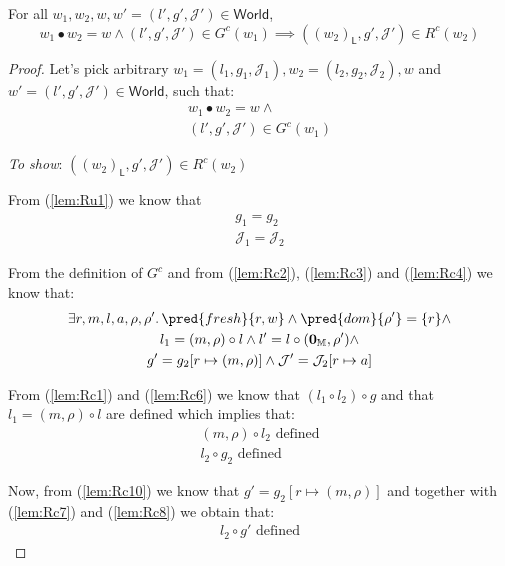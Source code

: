 \lem \label{lem:Rc}  For all $w_1, w_2, w, w' = (l', g', \mathcal{J}') \in \mathsf{World}$,
\[
	w_1 \bullet w_2 = w \land (l', g', \mathcal{J}') \in G^c(w_1) \implies ((w_2)_\mathsf{L}, g', \mathcal{J}') \in R^c(w_2)
\]

{\parindent0pt
\begin{proof}
Let's pick arbitrary $w_1 = (l_1, g_1, \mathcal{J}_1), w_2 = (l_2, g_2, \mathcal{J}_2), w$ and $w' = (l', g', \mathcal{J}') \in \mathsf{World}$, such that:
\begin{gather}
	\label{lem:Rc1} w_1 \bullet w_2 = w \land \\
	\label{lem:Rc2} (l', g', \mathcal{J}') \in G^c(w_1)
\end{gather}

\textit{To show}: $((w_2)_\mathsf{L}, g', \mathcal{J}') \in R^c(w_2)$

From (\ref{lem:Ru1}) we know that
\begin{gather}
	\label{lem:Rc3} g_1 = g_2 \\
	\label{lem:Rc4} \mathcal{J}_1 = \mathcal{J}_2
\end{gather}

From the definition of $G^c$ and from (\ref{lem:Rc2}), (\ref{lem:Rc3}) and (\ref{lem:Rc4}) we know that:
\begin{gather}
	\label{lem:Rc5} \exists r, m, l, a, \rho, \rho' \ldotp \pred{fresh}{r, w} \land \pred{dom}{\rho'} = \{r\} \land
	\\
	\label{lem:Rc6} l_1 = (m, \rho) \circ l \land l' = l \circ (\mathbf{0}_\mathbb{M}, \rho') \land
	\\
	\label{lem:Rc10} g' = g_2[r \mapsto (m, \rho) ] \land \mathcal{J}' = \mathcal{J}_2[r \mapsto a]
\end{gather}

From (\ref{lem:Rc1}) and (\ref{lem:Rc6}) we know that $(l_1 \circ l_2) \circ g$ and that $l_1 = (m, \rho) \circ l$ are defined which implies that:
\begin{gather}
	\label{lem:Rc7} (m, \rho) \circ l_2 \text{ defined}
	\\
	\label{lem:Rc8} l_2 \circ g_2 \text{ defined}
\end{gather}

Now, from (\ref{lem:Rc10}) we know that $g' = g_2[r \mapsto (m, \rho)]$ and together with (\ref{lem:Rc7}) and (\ref{lem:Rc8}) we obtain that:
\begin{gather}
	\label{lem:Rc9} l_2 \circ g' \text{ defined}
\end{gather}


\end{proof}}

